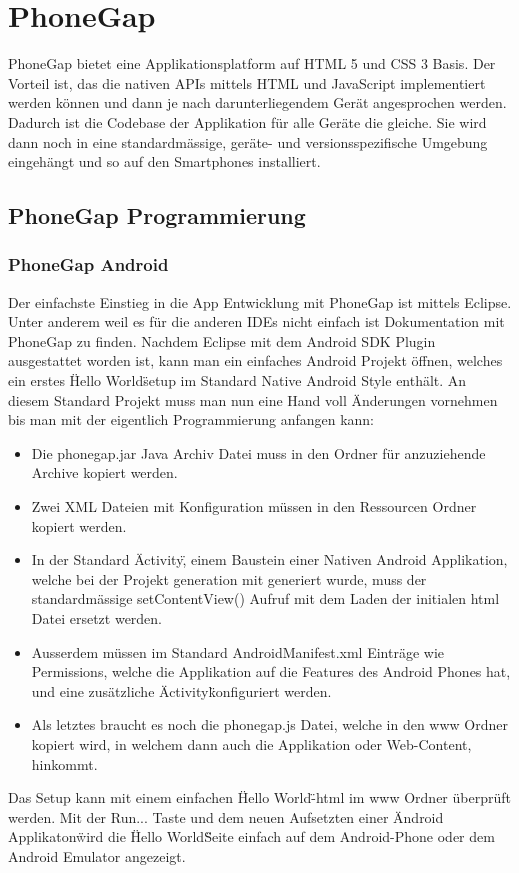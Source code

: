 
\newpage
\section{PhoneGap} %
\label{sec:PhoneGap}
PhoneGap bietet eine Applikationsplatform auf HTML 5 und CSS 3 Basis. Der Vorteil ist, das die nativen APIs mittels HTML und JavaScript implementiert werden können und dann je nach darunterliegendem Gerät angesprochen werden. Dadurch ist die Codebase der Applikation für alle Geräte die gleiche. Sie wird dann noch in eine standardmässige, geräte- und versionsspezifische Umgebung eingehängt und so auf den Smartphones installiert.

\subsection{PhoneGap Programmierung} %
\label{sub:PhoneGap Programmierung}

\subsubsection{PhoneGap Android} %
\label{ssub:PhoneGap Android}
Der einfachste Einstieg in die App Entwicklung mit PhoneGap ist mittels Eclipse. Unter anderem weil es für die anderen IDEs nicht einfach ist Dokumentation mit PhoneGap zu finden. Nachdem Eclipse mit dem Android SDK Plugin ausgestattet worden ist, kann man ein einfaches Android Projekt öffnen, welches ein erstes \"Hello World\" setup im Standard Native Android Style enthält. 
An diesem Standard Projekt muss man nun eine Hand voll Änderungen vornehmen bis man mit der eigentlich Programmierung anfangen kann:
\begin{itemize}
    \item Die phonegap.jar Java Archiv Datei muss in den Ordner für anzuziehende Archive kopiert werden.
    \item Zwei XML Dateien mit Konfiguration müssen in den Ressourcen Ordner kopiert werden. 
    \item In der Standard \"Activity\", einem Baustein einer Nativen Android Applikation, welche bei der Projekt generation mit generiert wurde, muss der standardmässige setContentView() Aufruf mit dem Laden der initialen html Datei ersetzt werden.
    \item Ausserdem müssen im Standard AndroidManifest.xml Einträge wie Permissions, welche die Applikation auf die Features des Android Phones hat, und eine zusätzliche \"Activity\" konfiguriert werden.
    \item Als letztes braucht es noch die phonegap.js Datei, welche in den www Ordner kopiert wird, in welchem dann auch die Applikation oder Web-Content, hinkommt.
\end{itemize}
Das Setup kann mit einem einfachen \"Hello World\"-html im www Ordner überprüft werden. Mit der Run... Taste und dem neuen Aufsetzten einer \"Android Applikaton\" wird die \"Hello World\" Seite einfach auf dem Android-Phone oder dem Android Emulator angezeigt.

